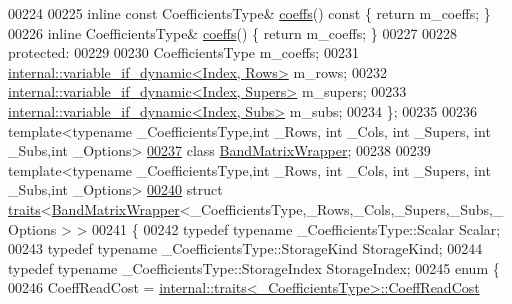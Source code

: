 \begin{DoxyCode}
00224 
00225     \textcolor{keyword}{inline} \textcolor{keyword}{const} CoefficientsType& \hyperlink{class_eigen_1_1internal_1_1_band_matrix_base_ab7c9e9a7ca5ad0f2f3a82ac582650499}{coeffs}()\textcolor{keyword}{ const }\{ \textcolor{keywordflow}{return} m\_coeffs; \}
00226     \textcolor{keyword}{inline} CoefficientsType& \hyperlink{class_eigen_1_1internal_1_1_band_matrix_base_ab7c9e9a7ca5ad0f2f3a82ac582650499}{coeffs}() \{ \textcolor{keywordflow}{return} m\_coeffs; \}
00227 
00228   \textcolor{keyword}{protected}:
00229 
00230     CoefficientsType m\_coeffs;
00231     \hyperlink{class_eigen_1_1internal_1_1variable__if__dynamic}{internal::variable\_if\_dynamic<Index, Rows>}   m\_rows;
00232     \hyperlink{class_eigen_1_1internal_1_1variable__if__dynamic}{internal::variable\_if\_dynamic<Index, Supers>} m\_supers;
00233     \hyperlink{class_eigen_1_1internal_1_1variable__if__dynamic}{internal::variable\_if\_dynamic<Index, Subs>}   m\_subs;
00234 \};
00235 
00236 \textcolor{keyword}{template}<\textcolor{keyword}{typename} \_CoefficientsType,\textcolor{keywordtype}{int} \_Rows, \textcolor{keywordtype}{int} \_Cols, \textcolor{keywordtype}{int} \_Supers, \textcolor{keywordtype}{int} \_Subs,\textcolor{keywordtype}{int} \_Options>
\hyperlink{class_eigen_1_1internal_1_1_band_matrix_wrapper}{00237} \textcolor{keyword}{class }\hyperlink{class_eigen_1_1internal_1_1_band_matrix_wrapper}{BandMatrixWrapper};
00238 
00239 \textcolor{keyword}{template}<\textcolor{keyword}{typename} \_CoefficientsType,\textcolor{keywordtype}{int} \_Rows, \textcolor{keywordtype}{int} \_Cols, \textcolor{keywordtype}{int} \_Supers, \textcolor{keywordtype}{int} \_Subs,\textcolor{keywordtype}{int} \_Options>
\hyperlink{struct_eigen_1_1internal_1_1traits_3_01_band_matrix_wrapper_3_01___coefficients_type_00_01___row768e2717402a9eceb38d536f65ceb4f1}{00240} \textcolor{keyword}{struct }\hyperlink{struct_eigen_1_1internal_1_1traits}{traits}<\hyperlink{class_eigen_1_1internal_1_1_band_matrix_wrapper}{BandMatrixWrapper}<\_CoefficientsType,\_Rows,\_Cols,\_Supers,\_Subs,\_Options
      > >
00241 \{
00242   \textcolor{keyword}{typedef} \textcolor{keyword}{typename} \_CoefficientsType::Scalar Scalar;
00243   \textcolor{keyword}{typedef} \textcolor{keyword}{typename} \_CoefficientsType::StorageKind StorageKind;
00244   \textcolor{keyword}{typedef} \textcolor{keyword}{typename} \_CoefficientsType::StorageIndex StorageIndex;
00245   \textcolor{keyword}{enum} \{
00246     CoeffReadCost = \hyperlink{struct_eigen_1_1internal_1_1traits}{internal::traits<\_CoefficientsType>::CoeffReadCost}

\end{DoxyCode}

